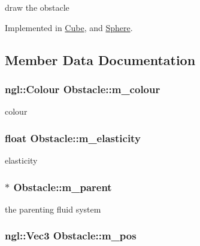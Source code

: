 draw the obstacle 

Implemented in \hyperlink{classCube_ab4dbd130d15e86b30212dad3189d1016}{Cube}, and \hyperlink{classSphere_a75a92a2b70974147560dd8c0514b2652}{Sphere}.

\subsection{Member Data Documentation}
\hypertarget{classObstacle_a0f812616869fc67cc7cb147f0e3524ef}{
\subsubsection[{m\_\-colour}]{\setlength{\rightskip}{0pt plus 5cm}ngl::Colour {\bf Obstacle::m\_\-colour}}}
\label{classObstacle_a0f812616869fc67cc7cb147f0e3524ef}


colour \hypertarget{classObstacle_a60e24ee62597021b70f05e61b427132e}{
\subsubsection[{m\_\-elasticity}]{\setlength{\rightskip}{0pt plus 5cm}float {\bf Obstacle::m\_\-elasticity}}}
\label{classObstacle_a60e24ee62597021b70f05e61b427132e}


elasticity \hypertarget{classObstacle_aaaeea9917fde7abb8fa8ca2ac73e51cb}{
\subsubsection[{m\_\-parent}]{$\ast$ {\bf Obstacle::m\_\-parent}}}
\label{classObstacle_aaaeea9917fde7abb8fa8ca2ac73e51cb}


the parenting fluid system \hypertarget{classObstacle_a7e390fb6bbe3b281e56c192138c19a27}{
\subsubsection[{m\_\-pos}]{\setlength{\rightskip}{0pt plus 5cm}ngl::Vec3 {\bf Obstacle::m\_\-pos}}}
\label{classObstacle_a7e390fb6bbe3b281e56c192138c19a27}


